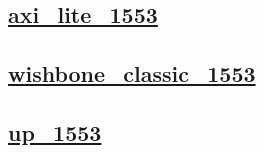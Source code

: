 \documentclass{article}
\begin{document}
  


  \subsection{\href{../files/axi_lite_1553-v.html}{axi\_lite\_1553}}

  \subsection{\href{../files/wishbone_classic_1553-v.html}{wishbone\_classic\_1553}}

  \subsection{\href{../files/up_1553-v.html}{up\_1553}}
\end{document}
